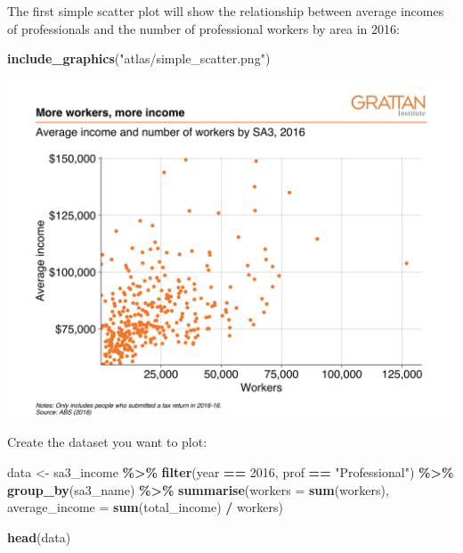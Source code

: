 \documentclass[
]{book}
\newenvironment{Shaded}{\begin{snugshade}}{\end{snugshade}}
\newcommand{\DataTypeTok}[1]{\textcolor[rgb]{0.13,0.29,0.53}{#1}}
\newcommand{\DecValTok}[1]{\textcolor[rgb]{0.00,0.00,0.81}{#1}}
\newcommand{\KeywordTok}[1]{\textcolor[rgb]{0.13,0.29,0.53}{\textbf{#1}}}
\newcommand{\NormalTok}[1]{#1}
\newcommand{\OperatorTok}[1]{\textcolor[rgb]{0.81,0.36,0.00}{\textbf{#1}}}
\newcommand{\StringTok}[1]{\textcolor[rgb]{0.31,0.60,0.02}{#1}}
\begin{document}
The first simple scatter plot will show the relationship between average incomes of professionals and the number of professional workers by area in 2016:

\begin{Shaded}
\begin{Highlighting}[]
\KeywordTok{include\_graphics}\NormalTok{(}\StringTok{"atlas/simple\_scatter.png"}\NormalTok{)}
\end{Highlighting}
\end{Shaded}

\includegraphics[width=44.44in]{atlas/simple_scatter}

Create the dataset you want to plot:

\begin{Shaded}
\begin{Highlighting}[]
\NormalTok{data \textless{}{-}}\StringTok{ }\NormalTok{sa3\_income }\OperatorTok{\%\textgreater{}\%}\StringTok{ }
\StringTok{  }\KeywordTok{filter}\NormalTok{(year }\OperatorTok{==}\StringTok{ }\DecValTok{2016}\NormalTok{,}
\NormalTok{         prof }\OperatorTok{==}\StringTok{ "Professional"}\NormalTok{) }\OperatorTok{\%\textgreater{}\%}\StringTok{ }
\StringTok{  }\KeywordTok{group\_by}\NormalTok{(sa3\_name) }\OperatorTok{\%\textgreater{}\%}\StringTok{ }
\StringTok{  }\KeywordTok{summarise}\NormalTok{(}\DataTypeTok{workers =} \KeywordTok{sum}\NormalTok{(workers),}
            \DataTypeTok{average\_income =} \KeywordTok{sum}\NormalTok{(total\_income) }\OperatorTok{/}\StringTok{ }\NormalTok{workers)}

\KeywordTok{head}\NormalTok{(data)}
\end{Highlighting}
\end{Shaded}
\end{document}
